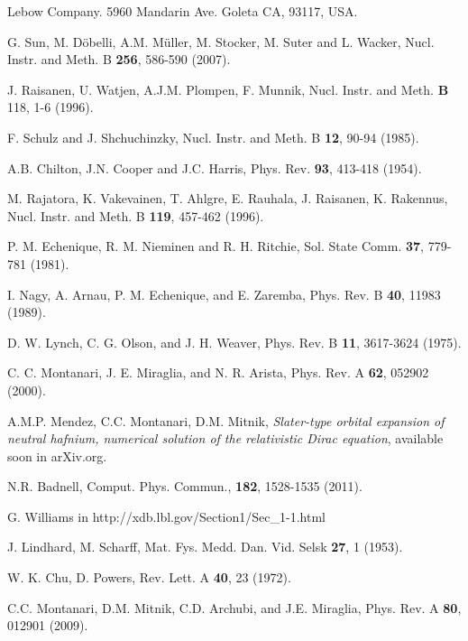 \documentclass[aps,pra,reprint,groupedaddress,showpacs,showkeys]{revtex4-1}
\begin{document}
\begin{thebibliography}{00}
Lebow Company. 5960 Mandarin Ave. Goleta CA, 93117, USA.

G. Sun, M. D\"{o}belli, A.M. M\"{u}ller, M. Stocker, M. Suter and 
L. Wacker, 
Nucl. Instr. and Meth. B \textbf{256}, 586-590 (2007).

J. Raisanen, U. Watjen, A.J.M. Plompen, F. Munnik, 
Nucl. Instr. and Meth. \textbf{B} 118, 1-6  (1996).

F. Schulz and J. Shchuchinzky, 
Nucl. Instr. and Meth. B \textbf{12},  90-94 (1985).

A.B. Chilton, J.N. Cooper and J.C. Harris, 
Phys. Rev. \textbf{93}, 413-418  (1954).

M. Rajatora, K. Vakevainen, T. Ahlgre, E. Rauhala, J. Raisanen, 
K. Rakennus, 
Nucl. Instr. and Meth. B \textbf{119}, 457-462 (1996).

P. M. Echenique, R. M. Nieminen and R. H. Ritchie, 
Sol. State Comm. \textbf{37}, 779-781 (1981).

I. Nagy, A. Arnau, P. M. Echenique, and E. Zaremba, 
Phys. Rev. B \textbf{40}, 11983 (1989).

D. W. Lynch, C. G. Olson, and J. H. Weaver, 
Phys. Rev. B \textbf{11}, 3617-3624 (1975).

C. C. Montanari, J. E. Miraglia, and N. R. Arista, 
Phys. Rev. A \textbf{62}, 052902 (2000).

A.M.P. Mendez, C.C. Montanari, D.M. Mitnik, 
\textit{Slater-type orbital expansion of neutral hafnium, numerical 
solution of the relativistic Dirac equation}, 
available soon in arXiv.org. 

N.R. Badnell, 
Comput. Phys. Commun., \textbf{182}, 1528-1535 (2011).

G. Williams in http://xdb.lbl.gov/Section1/Sec\_1-1.html

J. Lindhard, M. Scharff,  
Mat. Fys. Medd. Dan. Vid. Selsk  \textbf{27}, 1 (1953).

W. K. Chu, D. Powers, 
Rev. Lett. A \textbf{40}, 23 (1972).

C.C. Montanari, D.M. Mitnik, C.D. Archubi, and J.E. Miraglia, 
Phys. Rev. A \textbf{80}, 012901 (2009).

\end{thebibliography}
\end{document}
